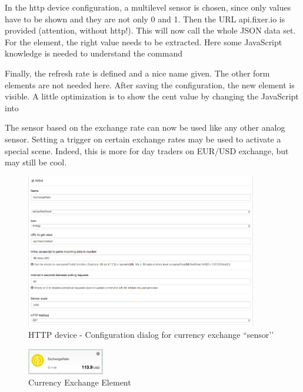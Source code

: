 In the http device configuration, a multilevel sensor is chosen, since only values 
have to be shown and they are not only 0 and 1. Then the URL api.fixer.io is provided 
(attention, without http!). This will now call the whole JSON data set. For the element, 
the right value needs to be extracted. Here some JavaScript knowledge is needed to 
understand the command 


Finally, the refresh rate is defined and a 
nice name given. The other form elements are not needed here.
After saving the configuration, the new element is visible. A little optimization is to 
show the cent value by changing the JavaScript into 


The sensor based on the exchange rate can now be used like any other analog sensor. 
Setting a trigger on certain exchange rates may be used to activate a special scene. 
Indeed, this is more for day traders on EUR/USD exchange, but may still be cool.


\begin{figure}
\begin{center}
\includegraphics[width=0.9\textwidth]{pngs/cap6/app29.png}
\caption{HTTP device - Configuration dialog for currency exchange ``sensor’’}
\label{app29}
\end{center}
\end{figure}

\begin{figure}
\begin{center}
\includegraphics[width=0.3\textwidth]{pngs/cap6/app30.png}
\caption{Currency Exchange Element}
\label{app30}
\end{center}
\end{figure}
